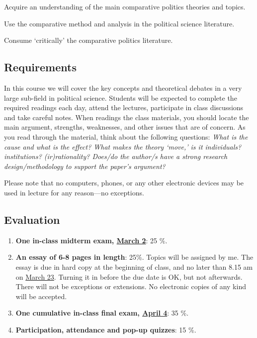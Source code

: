 \documentclass[letterpaper]{article}
\renewenvironment{itemize}{
  \begin{list}{}{
    \setlength{\leftmargin}{1.5em}
  }
}{
  \end{list}
}
\begin{document}
\begin{itemize}
	\item[$\bullet$] Acquire an understanding of the main comparative politics theories and topics.
	\item[$\bullet$] Use the comparative method and analysis in the political science literature.
	\item[$\bullet$] Consume `critically' the comparative politics literature.
\end{itemize}



\subsection*{Requirements}

In this course we will cover the key concepts and theoretical debates in a very large sub-field in political science. Students will be expected to complete the required readings each day, attend the lectures, participate in class discussions and take careful notes. When readings the class materials, you should locate the main argument, strengths, weaknesses, and other issues that are of concern. As you read through the material, think about the following questions: \emph{What is the cause and what is the effect? What makes the theory `move,' is it individuals? institutions? (ir)rationality? Does/do the author/s have a strong research design/methodology to support the paper's argument?}

Please note that no computers, phones, or any other electronic devices may be used in lecture for any reason---no exceptions.



\subsection*{Evaluation}


\begin{enumerate}
	\item {\bf One in-class midterm exam, \underline{March 2}}: 25 \%.
	\item {\bf An essay of 6-8 pages in length}: 25\%. Topics will be assigned by me. The essay is due in hard copy at the beginning of class, and no later than 8.15 am on \underline{March 23}. Turning it in before the due date is OK, but not afterwards. There will not be exceptions or extensions. No electronic copies of any kind will be accepted.
	\item {\bf One cumulative in-class final exam, \underline{April 4}}: 35 \%.
	\item {\bf Participation, attendance and pop-up quizzes}: 15 \%.
\end{enumerate}
\end{document}
